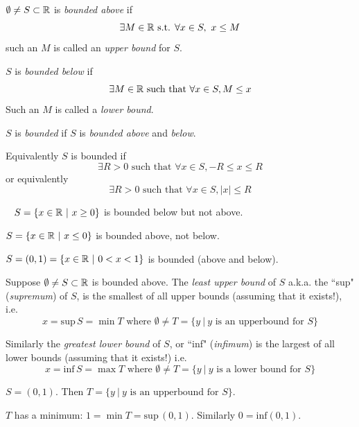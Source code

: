 \documentclass[10pt]{scrartcl}
\begin{document}
\begin{definition}
$\emptyset \neq S \subset \mathbb{R}$ is \emph{bounded above} if 
\[\exists M \in\mathbb{R} \text{ s.t. } \forall x \in S,~x \leq M\]
such an $M$ is called an \emph{upper bound} for $S$. 

$S$ is \emph{bounded below} if
\[\exists M \in \mathbb{R} \text{ such that } \forall x \in S, M \leq x\]
Such an $M$ is called a \emph{lower bound}.

$S$ is \emph{bounded} if $S$ is \emph{bounded above} and \emph{below}. 
\end{definition}\vspace*{5pt}

Equivalently $S$ is bounded if 
\[\exists R >0 \text{ such that } \forall x \in S, -R \leq x \leq R\]
or equivalently 
\[\exists R >0 \text{ such that } \forall x \in S, |x| \leq R\]\vspace*{2pt}

\begin{examples}~
$S = \{x \in\mathbb{R} ~|~ x \geq 0\}$ is bounded below but not above. 

$S = \{x \in\mathbb{R} ~|~ x \leq 0\}$ is bounded above, not below. 

$S = (0,1) = \{x \in\mathbb{R} ~|~ 0 < x < 1\}$ is bounded (above and below). 	
\end{examples}\vspace*{5pt}

\begin{definition}
Suppose $\emptyset \neq S\subset \mathbb{R}$ is bounded above. The \emph{least upper bound} of $S$ a.k.a. the ``sup" (\emph{supremum}) of $S$, is the smallest of all upper bounds (assuming that it exists!), i.e.
 \[x = \mathrm{sup}\, S = \min T\text{ where }\emptyset \neq T = \{y ~|~ y \text{ is an upperbound for } S\}\]
 
 Similarly the \emph{greatest lower bound} of $S$, or ``inf" (\emph{infimum}) is the largest of all lower bounds (assuming that it exists!) i.e. 
 \[x = \mathrm{inf}\, S = \max T\text{ where }\emptyset \neq T = \{y~|~ y \text{ is a lower bound for } S \}\]
\end{definition}\vspace*{5pt}

\begin{example}
$S = (0,1)$. Then $T = \{y ~|~ y \text{ is an upperbound for } S\}$. 

$T$ has a minimum: $1 = \min T = \mathrm{sup}\, (0,1)$. Similarly $0 = \mathrm{inf}(0,1)$. 
\end{example}\vspace*{5pt}
\end{document}
